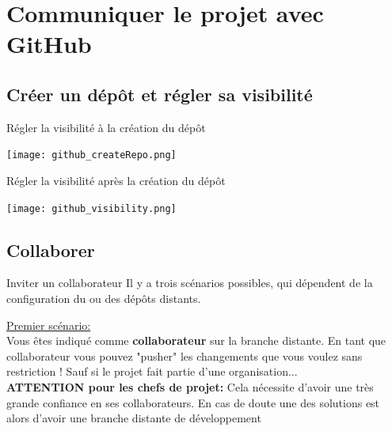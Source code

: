 \documentclass{beamer}
\begin{document}
\section{Communiquer le projet avec GitHub}


\subsection{Créer un dépôt et régler sa visibilité}
\begin{frame}{Régler la visibilité à la création du dépôt}
\begin{center}
	\texttt{[image: github\_createRepo.png]}
\end{center}
\end{frame}

\begin{frame}{Régler la visibilité après la création du dépôt}
\begin{center}
	\texttt{[image: github\_visibility.png]}
\end{center}
\end{frame}

\subsection{Collaborer}
\begin{frame}{Inviter un collaborateur}
Il y a trois scénarios possibles, qui dépendent de la configuration du ou des dépôts distants.
\medskip

\underline{Premier scénario:}\\
\smallskip
Vous êtes indiqué comme \textbf{collaborateur} sur la branche distante. En tant que collaborateur vous pouvez "pusher" les changements que vous voulez sans restriction ! Sauf si le projet fait partie d'une organisation...\\
\medskip
\textbf{ATTENTION pour les chefs de projet:} Cela nécessite d'avoir une très grande confiance en ses collaborateurs. En cas de doute une des solutions est alors d'avoir une branche distante de développement
\end{frame}
\end{document}
